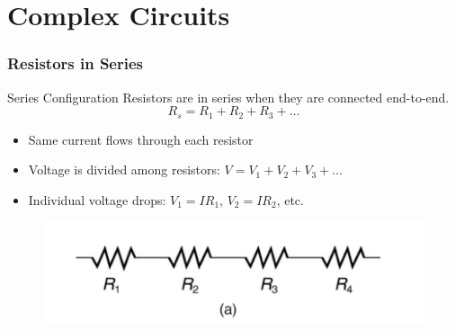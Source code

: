 \documentclass{beamer}
\begin{document}
\section{Complex Circuits}
\begin{frame}
    \frametitle{Resistors in Series}
    \begin{block}{Series Configuration}
        Resistors are in series when they are connected end-to-end.
        \[ R_s = R_1 + R_2 + R_3 + \ldots \]
    \end{block}
    \begin{itemize}
        \item Same current flows through each resistor
        \item Voltage is divided among resistors: $V = V_1 + V_2 + V_3 + \ldots$
        \item Individual voltage drops: $V_1 = IR_1$, $V_2 = IR_2$, etc.
    \end{itemize}
    \begin{center}
       \begin{figure}
           \centering
           \includegraphics[width=0.75\linewidth]{phys12-circuits-resistors-in-series.png}
       \end{figure}
    \end{center}
\end{frame}
\end{document}
